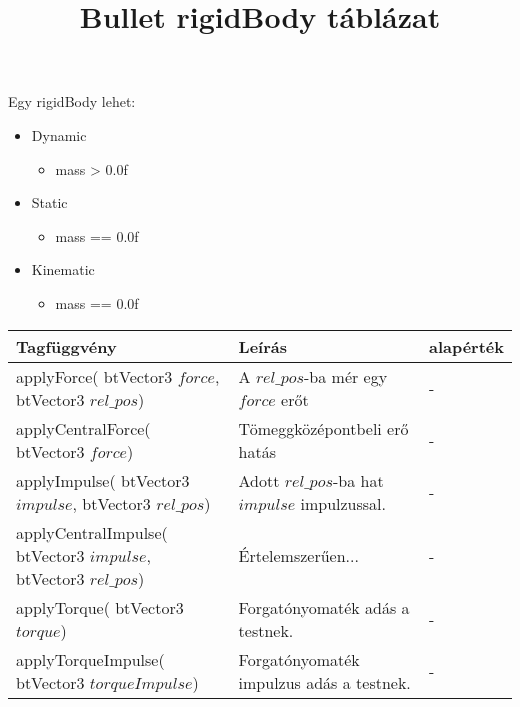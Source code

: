 \documentclass[12p,a4paper,notitlepage]{scrartcl}
\title{Bullet rigidBody táblázat}
\subtitle{}
\date{}
\begin{document}
\maketitle

Egy rigidBody lehet:
\begin{itemize}
\item Dynamic
\begin{itemize}
\item mass > 0.0f
\end{itemize}
\item Static
\begin{itemize}
\item mass == 0.0f
\end{itemize}
\item Kinematic
\begin{itemize}
\item mass == 0.0f
\end{itemize}
\end{itemize}


\begin{tabular}{|p{65mm}|p{85mm}|p{20mm}|}
\hline
Tagfüggvény & Leírás & alapérték \\
\hline 
\hline 
applyForce( \newline
btVector3 $force$, \newline
btVector3 $rel\_pos$) & A $rel\_pos$-ba mér egy $force$ erőt & - \\
\hline
applyCentralForce( \newline
btVector3 $force$) & Tömeggközépontbeli erő hatás & - \\
\hline
applyImpulse( \newline 
btVector3 $impulse$, \newline
btVector3 $rel\_pos$) & Adott $rel\_pos$-ba hat $impulse$ impulzussal. & -\\
\hline
applyCentralImpulse(\newline 
btVector3 $impulse$, \newline 
btVector3 $rel\_pos$) & Értelemszerűen... & - \\
\hline
applyTorque(\newline 
btVector3 $torque$) & Forgatónyomaték adás a testnek. & - \\
\hline
applyTorqueImpulse( \newline
btVector3 $torqueImpulse$) & Forgatónyomaték impulzus adás a testnek. & - \\
\hline
\end{tabular}
\end{document}
